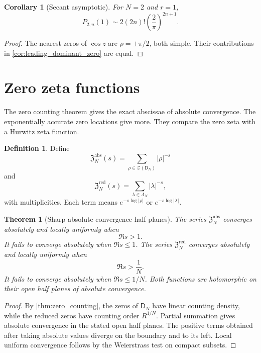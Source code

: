 \documentclass{aomart}
\newtheorem{theorem}{Theorem}[section]
\newtheorem{corollary}[corollary]{Corollary}
\theoremstyle{definition}
\newtheorem{definition}[definition]{Definition}
\theoremstyle{remark}
\newcommand{\Zcal}{\mathcal Z}
\newcommand{\Dfun}{\mathsf D}
\begin{document}
\begin{corollary}[Secant asymptotic]\label{cor:secant_asymptotic}
For $N=2$ and $r=1$,
\[
P_{2,n}(1)
\sim
2(2n)!\left(\frac2\pi\right)^{2n+1}.
\]
\end{corollary}

\begin{proof}
The nearest zeros of $\cos z$ are $\rho=\pm\pi/2$, both simple.  Their contributions in \cref{cor:leading_dominant_zero} are equal.
\end{proof}

\section{Zero zeta functions}\label{sec:zero_zeta}

The zero counting theorem gives the exact abscissae of absolute convergence.  The exponentially accurate zero locations give more.  They compare the zero zeta with a Hurwitz zeta function.

\begin{definition}\label{def:absolute_zero_zetas}
Define
\[
\mathfrak Z_N^{\mathrm{abs}}(s)
=
\sum_{\rho\in\Zcal(\Dfun_N)}|\rho|^{-s}
\]
and
\[
\mathfrak Z_N^{\mathrm{red}}(s)
=
\sum_{\lambda\in\Lambda_N}|\lambda|^{-s},
\]
with multiplicities.  Each term means $e^{-s\log|\rho|}$ or $e^{-s\log|\lambda|}$.
\end{definition}

\begin{theorem}[Sharp absolute convergence half planes]\label{thm:zeta_convergence}
The series $\mathfrak Z_N^{\mathrm{abs}}$ converges absolutely and locally uniformly when
\[
\Re s>1.
\]
It fails to converge absolutely when $\Re s\leq1$.  The series $\mathfrak Z_N^{\mathrm{red}}$ converges absolutely and locally uniformly when
\[
\Re s>\frac1N.
\]
It fails to converge absolutely when $\Re s\leq1/N$.  Both functions are holomorphic on their open half planes of absolute convergence.
\end{theorem}

\begin{proof}
By \cref{thm:zero_counting}, the zeros of $\Dfun_N$ have linear counting density, while the reduced zeros have counting order $R^{1/N}$.  Partial summation gives absolute convergence in the stated open half planes.  The positive terms obtained after taking absolute values diverge on the boundary and to its left.  Local uniform convergence follows by the Weierstrass test on compact subsets.
\end{proof}
\end{document}

